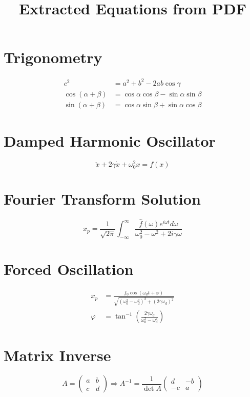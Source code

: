 \documentclass{article}
\begin{document}
\title{Extracted Equations from PDF}
\author{}
\date{}
\maketitle

\section{Trigonometry}
\begin{align}
    c^2 &= a^2 + b^2 - 2ab \cos \gamma \\
    \cos(\alpha + \beta) &= \cos\alpha \cos\beta - \sin\alpha \sin\beta \\
    \sin(\alpha + \beta) &= \cos\alpha \sin\beta + \sin\alpha \cos\beta
\end{align}

\section{Damped Harmonic Oscillator}
\begin{equation}
    \ddot{x} + 2\gamma\dot{x} + \omega_0^2 x = f(x)
\end{equation}

\section{Fourier Transform Solution}
\begin{equation}
    x_p = \frac{1}{\sqrt{2\pi}} \int_{-\infty}^{\infty} \frac{\hat{f}(\omega) e^{i\omega t} d\omega}{\omega_0^2 - \omega^2 + 2i\gamma\omega}
\end{equation}

\section{Forced Oscillation}
\begin{align}
    x_p &= \frac{f_0 \cos(\omega_d t + \varphi)}{\sqrt{(\omega_0^2 - \omega_d^2)^2 + (2\gamma\omega_d)^2}} \\
    \varphi &= \tan^{-1} \left( \frac{2\gamma\omega_d}{\omega_0^2 - \omega_d^2} \right)
\end{align}

\section{Matrix Inverse}
\begin{equation}
    A = \begin{pmatrix} a & b \\ c & d \end{pmatrix} \Rightarrow A^{-1} = \frac{1}{\det A} \begin{pmatrix} d & -b \\ -c & a \end{pmatrix}
\end{equation}
\end{document}
